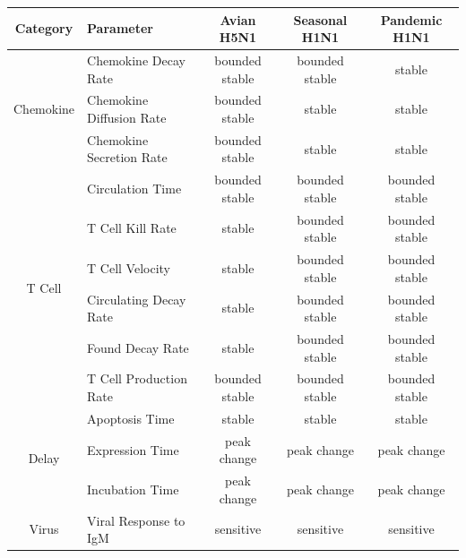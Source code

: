 \documentclass[10pt]{article}
\begin{document}
\begin{table}[!ht]
\begin{center}
\begin{tabular}{| c | l | c c c |}
  \hline                        
  Category & Parameter & Avian H5N1 & Seasonal H1N1 & Pandemic H1N1 \\
  \hline
  \multirow{3}{*}{Chemokine} & Chemokine Decay Rate & \cellcolor{blue!30}bounded stable & \cellcolor{blue!30}bounded stable & \cellcolor{green!50}stable \\
  & Chemokine Diffusion Rate & \cellcolor{blue!30}bounded stable & \cellcolor{green!50}stable& \cellcolor{green!50}stable \\
  & Chemokine Secretion Rate & \cellcolor{blue!30}bounded stable & \cellcolor{green!50}stable & \cellcolor{green!50}stable \\
  \hline
  \multirow{6}{*}{T Cell} & Circulation Time & \cellcolor{blue!30}bounded stable & \cellcolor{blue!30}bounded stable & \cellcolor{blue!30}bounded stable \\
  & T Cell Kill Rate & \cellcolor{green!50}stable & \cellcolor{blue!30}bounded stable & \cellcolor{blue!30}bounded stable \\
  & T Cell Velocity & \cellcolor{green!50}stable & \cellcolor{blue!30}bounded stable & \cellcolor{blue!30}bounded stable \\
  & Circulating Decay Rate & \cellcolor{green!50}stable & \cellcolor{blue!30}bounded stable& \cellcolor{blue!30}bounded stable \\
  & Found Decay Rate & \cellcolor{green!50}stable & \cellcolor{blue!30}bounded stable & \cellcolor{blue!30}bounded stable \\
  & T Cell Production Rate & \cellcolor{blue!30}bounded stable & \cellcolor{blue!30}bounded stable & \cellcolor{blue!30}bounded stable \\
  \hline
  \multirow{3}{*}{Delay} & Apoptosis Time & \cellcolor{green!50}stable & \cellcolor{green!50}stable & \cellcolor{green!50}stable \\
  & Expression Time & \cellcolor{yellow!50}peak change & \cellcolor{yellow!50}peak change & \cellcolor{yellow!50}peak change \\
  & Incubation Time &  \cellcolor{yellow!50}peak change & \cellcolor{yellow!50}peak change & \cellcolor{yellow!50}peak change \\
  \hline 
  \multirow{4}{*}{Virus} & Viral Response to IgM & \cellcolor{red!40}sensitive & \cellcolor{red!40}sensitive & \cellcolor{red!40}sensitive \\

\end{tabular}
\end{center}
\end{table}
\end{document}

